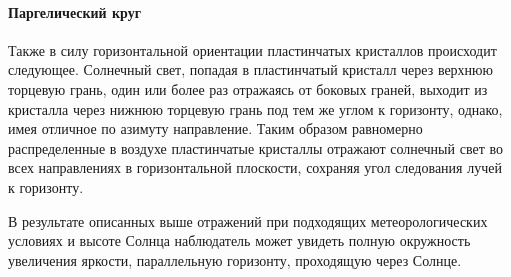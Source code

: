 \paragraph{Паргелический круг}

Также в силу горизонтальной ориентации пластинчатых кристаллов происходит следующее. Солнечный свет, попадая в пластинчатый кристалл через верхнюю торцевую грань, один или более раз отражаясь от боковых граней, выходит из кристалла через нижнюю торцевую грань под тем же углом к горизонту, однако, имея отличное по азимуту направление. Таким образом равномерно распределенные в воздухе пластинчатые кристаллы отражают солнечный свет во всех направлениях в горизонтальной плоскости, сохраняя угол следования лучей к горизонту.

В результате описанных выше отражений при подходящих метеорологических условиях и высоте Солнца наблюдатель может увидеть полную окружность увеличения яркости, параллельную горизонту, проходящую через Солнце.